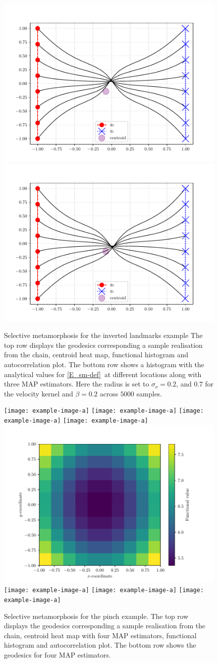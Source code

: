 \documentclass[runningheads]{llncs}
\begin{document}
\begin{figure}
\begin{minipage}{\textwidth}
    \includegraphics[width=.23\textwidth]{../results/results_criss_cross/MAP_center_1.pdf}
    \includegraphics[width=.23\textwidth]{../results/results_criss_cross/MAP_center_2.pdf}
    \caption{Selective metamorphosis for the inverted landmarks example The top
    row displays the geodesics corresponding a sample realisation from the
    chain, centroid heat map, functional histogram and
    autocorrelation plot. The bottom row shows a histogram with the analytical
    values for \eqref{E_sm-def} at different locations along with three MAP
    estimators. Here the radius is set to $\sigma_\nu = 0.2$, and $0.7$ for the
    velocity kernel and $\beta=0.2$ across $5000$ samples.}
    \label{fig:selective:crisscross}
\end{minipage}
\end{figure}
\begin{figure}
\centering
\begin{minipage}{\textwidth}
  \centering
    \texttt{[image: example-image-a]}
    \texttt{[image: example-image-a]}
    \texttt{[image: example-image-a]}
    \texttt{[image: example-image-a]}\\[0.23cm]
    \includegraphics[width=.23\textwidth]{density_squeeze.pdf}
    \texttt{[image: example-image-a]}
    \texttt{[image: example-image-a]}
    \texttt{[image: example-image-a]}
    \caption{Selective metamorphosis for the pinch example. The top row displays
    the geodesics corresponding a sample realisation from the chain, centroid
    heat map with four MAP estimators, functional histogram and autocorrelation
    plot. The bottom row shows the geodesics for four MAP estimators.}
    \label{fig:selective:pinch}
\end{minipage}
\end{figure}
\end{document}
